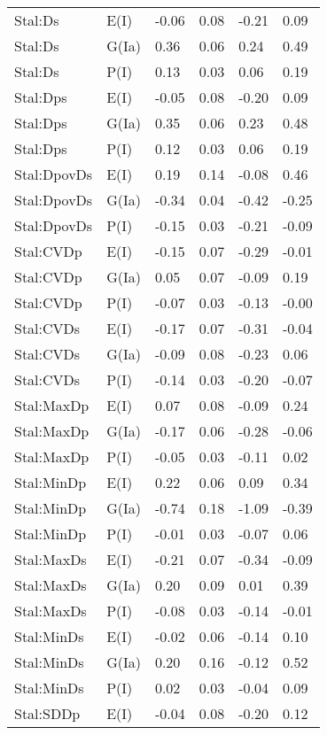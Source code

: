 \begin{center}
\begin{longtable}{|p{1.1in}|p{0.7in}|p{0.7in}|p{0.6in}|p{0.6in}|p{0.6in}|}
  Stal:Ds & E(I) & -0.06 & 0.08 & -0.21 & 0.09 \\ 
  Stal:Ds & G(Ia) & 0.36 & 0.06 & 0.24 & 0.49 \\ 
  Stal:Ds & P(I) & 0.13 & 0.03 & 0.06 & 0.19 \\ 
  Stal:Dps & E(I) & -0.05 & 0.08 & -0.20 & 0.09 \\ 
  Stal:Dps & G(Ia) & 0.35 & 0.06 & 0.23 & 0.48 \\ 
  Stal:Dps & P(I) & 0.12 & 0.03 & 0.06 & 0.19 \\ 
  Stal:DpovDs & E(I) & 0.19 & 0.14 & -0.08 & 0.46 \\ 
  Stal:DpovDs & G(Ia) & -0.34 & 0.04 & -0.42 & -0.25 \\ 
  Stal:DpovDs & P(I) & -0.15 & 0.03 & -0.21 & -0.09 \\ 
  Stal:CVDp & E(I) & -0.15 & 0.07 & -0.29 & -0.01 \\ 
  Stal:CVDp & G(Ia) & 0.05 & 0.07 & -0.09 & 0.19 \\ 
  Stal:CVDp & P(I) & -0.07 & 0.03 & -0.13 & -0.00 \\ 
  Stal:CVDs & E(I) & -0.17 & 0.07 & -0.31 & -0.04 \\ 
  Stal:CVDs & G(Ia) & -0.09 & 0.08 & -0.23 & 0.06 \\ 
  Stal:CVDs & P(I) & -0.14 & 0.03 & -0.20 & -0.07 \\ 
  Stal:MaxDp & E(I) & 0.07 & 0.08 & -0.09 & 0.24 \\ 
  Stal:MaxDp & G(Ia) & -0.17 & 0.06 & -0.28 & -0.06 \\ 
  Stal:MaxDp & P(I) & -0.05 & 0.03 & -0.11 & 0.02 \\ 
  Stal:MinDp & E(I) & 0.22 & 0.06 & 0.09 & 0.34 \\ 
  Stal:MinDp & G(Ia) & -0.74 & 0.18 & -1.09 & -0.39 \\ 
  Stal:MinDp & P(I) & -0.01 & 0.03 & -0.07 & 0.06 \\ 
  Stal:MaxDs & E(I) & -0.21 & 0.07 & -0.34 & -0.09 \\ 
  Stal:MaxDs & G(Ia) & 0.20 & 0.09 & 0.01 & 0.39 \\ 
  Stal:MaxDs & P(I) & -0.08 & 0.03 & -0.14 & -0.01 \\ 
  Stal:MinDs & E(I) & -0.02 & 0.06 & -0.14 & 0.10 \\ 
  Stal:MinDs & G(Ia) & 0.20 & 0.16 & -0.12 & 0.52 \\ 
  Stal:MinDs & P(I) & 0.02 & 0.03 & -0.04 & 0.09 \\ 
  Stal:SDDp & E(I) & -0.04 & 0.08 & -0.20 & 0.12 \\ 

\end{longtable}
\end{center}
